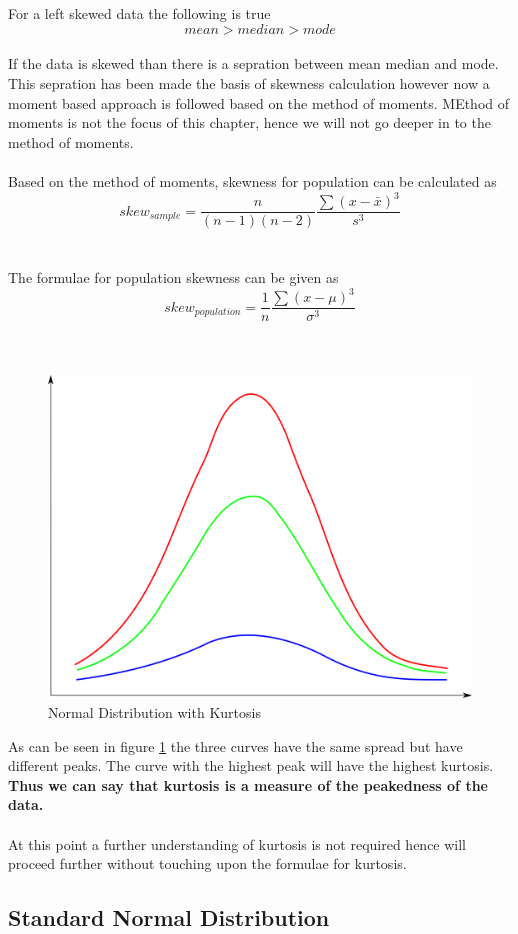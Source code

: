 \documentclass[twoside,12pt]{report}  %
\begin{document}
\\
\\
For a left skewed data the following is true
$$ mean > median > mode $$
\\
If the data is skewed than there is a sepration between mean median and mode. This sepration has been made the basis of skewness calculation however now a moment based approach is followed based on the method of moments. MEthod of moments is not the focus of this chapter, hence we will not go deeper in to the method of moments.
\\
\\
Based on the method of moments, skewness for population can be calculated as 
$$\boxed{skew_{sample} = \frac{n}{(n-1)(n-2)} \frac{\sum (x - \bar{x})^3}{s^{3}}} $$
\\
\\
The formulae for population skewness can be given as
$$ \boxed{skew_{population} = \frac{1}{n} \frac{\sum (x - \mu)^3}{\sigma^3}} $$
\\
\\
\begin{figure}[H]
	\centering
	\includegraphics[width=0.5\linewidth]{./images/kurtosis.png}
	\caption{Normal Distribution with Kurtosis}
	\label{figure_kurtosis}
\end{figure}
\noindent
As can be seen in figure \ref{figure_kurtosis} the  three curves have the same spread but have different peaks. The curve with the highest peak will have the highest kurtosis. \textbf{Thus we can say that kurtosis is a measure of the peakedness of the data.}
\\
\\
At this point a further understanding of kurtosis is not required hence will proceed further without touching upon the formulae for kurtosis.

\vfill
\pagebreak

\subsection{Standard Normal Distribution}
\end{document}
